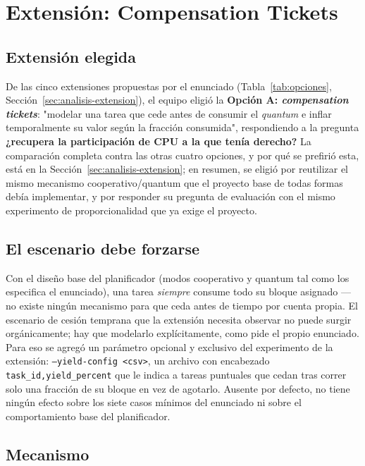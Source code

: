 \section{Extensión: Compensation Tickets}
\label{sec:extension}

\subsection{Extensión elegida}

De las cinco extensiones propuestas por el enunciado (Tabla~\ref{tab:opciones},
Sección~\ref{sec:analisis-extension}), el equipo eligió la
\textbf{Opción A: \textit{compensation tickets}}: "modelar una tarea que
cede antes de consumir el \textit{quantum} e inflar temporalmente su valor
según la fracción consumida", respondiendo a la pregunta \textbf{¿recupera
la participación de CPU a la que tenía derecho?} La comparación completa
contra las otras cuatro opciones, y por qué se prefirió esta, está en la
Sección~\ref{sec:analisis-extension}; en resumen, se eligió por reutilizar
el mismo mecanismo cooperativo/quantum que el proyecto base de todas formas
debía implementar, y por responder su pregunta de evaluación con el mismo
experimento de proporcionalidad que ya exige el proyecto.

\subsection{El escenario debe forzarse}

Con el diseño base del planificador (modos cooperativo y quantum tal como
los especifica el enunciado), una tarea \emph{siempre} consume todo su
bloque asignado --- no existe ningún mecanismo para que ceda antes de
tiempo por cuenta propia. El escenario de cesión temprana que la extensión
necesita observar no puede surgir orgánicamente; hay que modelarlo
explícitamente, como pide el propio enunciado. Para eso se agregó un
parámetro opcional y exclusivo del experimento de la extensión:
\texttt{--yield-config <csv>}, un archivo con encabezado
\texttt{task\_id,yield\_percent} que le indica a tareas puntuales que cedan
tras correr solo una fracción de su bloque en vez de agotarlo. Ausente por
defecto, no tiene ningún efecto sobre los siete casos mínimos del
enunciado ni sobre el comportamiento base del planificador.

\subsection{Mecanismo}

